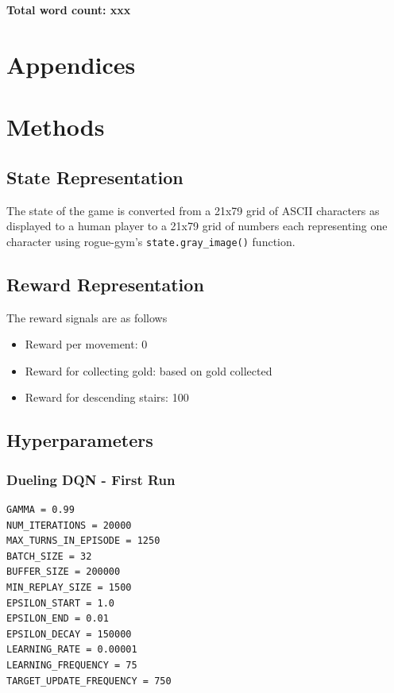 \documentclass[12pt,a4paper]{article}
\begin{document}



    \textbf{Total word count: xxx}
    \medskip

    
    

    \medskip

    \appendix
    \section*{Appendices}
    \section{Methods}\label{sec:methods}

    \subsection{State Representation}\label{subsec:state-representation}
    The state of the game is converted from a 21x79 grid of ASCII characters as displayed to a human player to a 21x79 grid of
    numbers each representing one character using rogue-gym's \texttt{state.gray\_image()} function.

    \subsection{Reward Representation}\label{subsec:reward-representation}
    The reward signals are as follows
    \begin{itemize}
        \item Reward per movement: 0
        \item Reward for collecting gold: based on gold collected
        \item Reward for descending stairs: 100
    \end{itemize}

    \subsection{Hyperparameters}\label{subsec:hyperparameters}
    \subsubsection{Dueling DQN - First Run}
    \begin{lstlisting}[label={lst:ddqnhyperparameters}]
GAMMA = 0.99
NUM_ITERATIONS = 20000
MAX_TURNS_IN_EPISODE = 1250
BATCH_SIZE = 32
BUFFER_SIZE = 200000
MIN_REPLAY_SIZE = 1500
EPSILON_START = 1.0
EPSILON_END = 0.01
EPSILON_DECAY = 150000
LEARNING_RATE = 0.00001
LEARNING_FREQUENCY = 75
TARGET_UPDATE_FREQUENCY = 750
    \end{lstlisting}
\end{document}
